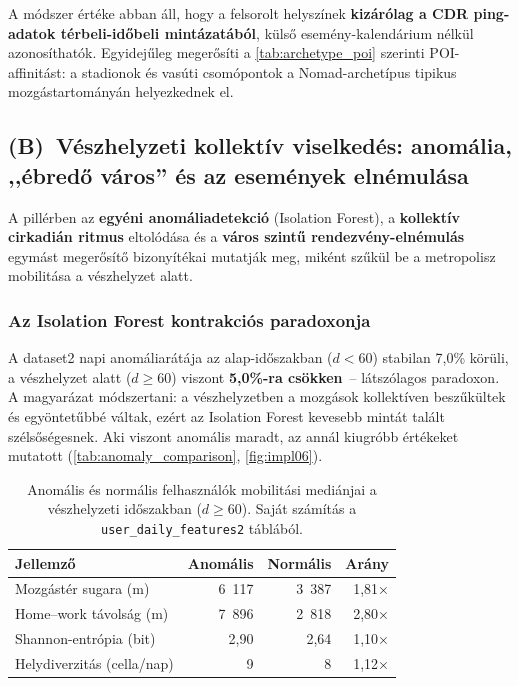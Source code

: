 A módszer értéke abban áll, hogy a felsorolt helyszínek \textbf{kizárólag a CDR ping-adatok térbeli-időbeli mintázatából}, külső esemény-kalendárium nélkül azonosíthatók. Egyidejűleg megerősíti a \autoref{tab:archetype_poi} szerinti POI-affinitást: a stadionok és vasúti csomópontok a Nomad-archetípus tipikus mozgástartományán helyezkednek el.

\subsection{(B)~Vészhelyzeti kollektív viselkedés: anomália, ,,ébredő város'' és az események elnémulása}
\label{subsec:emergency}

A pillérben az \textbf{egyéni anomáliadetekció} (Isolation Forest), a \textbf{kollektív cirkadián ritmus} eltolódása és a \textbf{város szintű rendezvény-elnémulás} egymást megerősítő bizonyítékai mutatják meg, miként szűkül be a metropolisz mobilitása a vészhelyzet alatt.

\subsubsection*{Az Isolation Forest kontrakciós paradoxonja}

A dataset2 napi anomáliarátája az alap-időszakban ($d<60$) stabilan 7{,}0\% körüli, a vészhelyzet alatt ($d \geq 60$) viszont \textbf{5{,}0\%-ra csökken}~-- látszólagos paradoxon. A magyarázat módszertani: a vészhelyzetben a mozgások kollektíven beszűkültek és egyöntetűbbé váltak, ezért az Isolation Forest kevesebb mintát talált szélsőségesnek. Aki viszont anomális maradt, az annál kiugróbb értékeket mutatott (\autoref{tab:anomaly_comparison}, \autoref{fig:impl06}).

\begin{table}[H]
\centering
\caption{Anomális és normális felhasználók mobilitási mediánjai a vészhelyzeti időszakban ($d \geq 60$). Saját számítás a \texttt{user\_daily\_features2} táblából.}
\label{tab:anomaly_comparison}
\begin{tabular}{l r r r}
\hline
\textbf{Jellemző} & \textbf{Anomális} & \textbf{Normális} & \textbf{Arány} \\
\hline
Mozgástér sugara (m)       & 6~117 & 3~387 & 1{,}81× \\
Home--work távolság (m)    & 7~896 & 2~818 & 2{,}80× \\
Shannon-entrópia (bit)     & 2{,}90 & 2{,}64 & 1{,}10× \\
Helydiverzitás (cella/nap) & 9     & 8     & 1{,}12× \\
\hline
\end{tabular}
\end{table}

